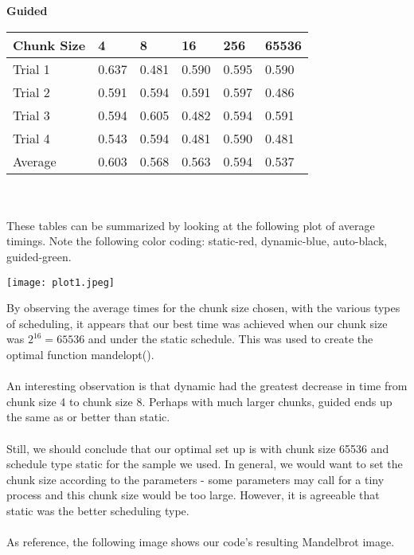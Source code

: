 \documentclass{article}
\begin{document}
\newpage
\textbf{Guided} \\
\begin{tabular}{l|l l l l l}
\hline Chunk Size&4&8&16&256&65536 \\ \hline
Trial 1&0.637&0.481&0.590&0.595&0.590 \\
Trial 2&0.591&0.594&0.591&0.597&0.486 \\
Trial 3&0.594&0.605&0.482&0.594&0.591 \\
Trial 4&0.543&0.594&0.481&0.590&0.481 \\
Average&0.603&0.568&0.563&0.594&0.537
\end{tabular}
\\ \\
These tables can be summarized by looking at the following plot of average timings. Note the following color coding: static-red, dynamic-blue, auto-black, guided-green.
\begin{center} \texttt{[image: plot1.jpeg]} \end{center}

By observing the average times for the chunk size chosen, with the various types of
scheduling, it appears that our best time was achieved when our chunk size was
$2^{16}=65536$ and under the static schedule. This was used to create the optimal function mandelopt().
\\ \\
An interesting observation is that dynamic had the greatest decrease in
time from chunk size 4 to chunk size 8. Perhaps with much larger chunks, guided
ends up the same as or better than static.
\\ \\
Still, we should conclude that our optimal set up is with chunk size 65536 and schedule
type static for the sample we used. In general, we would want to set the chunk size according to the parameters - some parameters may call for a tiny process and this chunk size would be too large. However, it is agreeable that static was the better scheduling type.
\\ \\
As reference, the following image shows our code's resulting Mandelbrot image.

\end{document}
